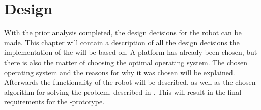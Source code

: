\chapter{Design} \label{cha:design}

With the prior analysis completed, the design decisions for the robot can be made. This chapter will contain a description of all the design decisions the implementation of the \projname{} will be based on. A platform has already been chosen, but there is also the matter of choosing the optimal operating system. The chosen operating system and the reasons for why it was chosen will be explained. Afterwards the functionality of the robot will be described, as well as the chosen algorithm for solving the problem, described in . This will result in the final requirements for the \projname{}-prototype.








